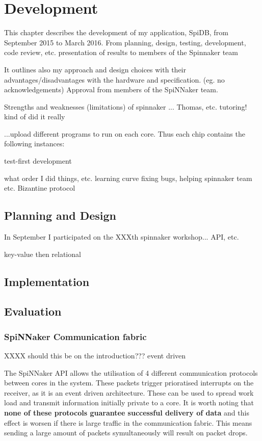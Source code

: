 \chapter{Development}

This chapter describes the development of my application, SpiDB, from September 2015 to March 2016.
From planning, design, testing, development, code review, etc. presentation of results to members of the Spinnaker team

It outlines also my approach and design choices with their advantages/disadvantages with the hardware and specification. (eg. no acknowledgements)
Approval from members of the SpiNNaker team.

Strengths and weaknesses (limitations) of spinnaker
...
Thomas, etc.
tutoring! kind of did it really


...upload different programs to run on each core.
Thus each chip contains the following instances: 

test-first development

what order I did things, etc.
learning curve
fixing bugs, helping spinnaker team etc.
Bizantine protocol

\section{Planning and Design}
In September I participated on the XXXth spinnaker workshop...
API, etc.

key-value then relational

\section{Implementation}

\section{Evaluation}

\subsection{SpiNNaker Communication fabric}

XXXX should this be on the introduction???
event driven

The SpiNNaker API allows the utilisation of 4 different communication protocols between cores in the system. These packets trigger prioratised interrupts on the receiver, as it is an event driven architecture. These can be used to spread work load and transmit information initially private to a core.
It is worth noting that \textbf{none of these protocols guarantee successful delivery of data} and this effect is worsen if there is large traffic in the communication fabric. This means sending a large amount of packets symultaneously will result on packet drops.

